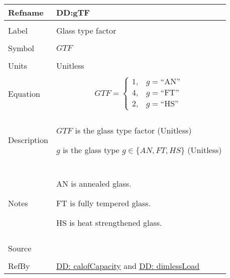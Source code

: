 \documentclass[12pt]{article}
\begin{document}
\vspace{\baselineskip}
\noindent
\begin{minipage}{\textwidth}
\begin{tabular}{>{\raggedright}p{}>{\raggedright\arraybackslash}p{}}
\toprule \textbf{Refname} & \textbf{DD:gTF}
\label{DD:gTF}
\\ \midrule \\
Label & Glass type factor
        
\\ \midrule \\
Symbol & $GTF$
         
\\ \midrule \\
Units & Unitless
        
\\ \midrule \\
Equation & \begin{displaymath}
           GTF=\begin{cases}
               1, & g=\text{``AN''}\\
4, & g=\text{``FT''}\\
2, & g=\text{``HS''}
               \end{cases}
           \end{displaymath}
\\ \midrule \\
Description & \begin{symbDescription}
              \item{$GTF$ is the glass type factor (Unitless)}
              \item{$g$ is the glass type $g\in{}\{AN,FT,HS\}$ (Unitless)}
              \end{symbDescription}
\\ \midrule \\
Notes & AN is annealed glass.
        
        FT is fully tempered glass.
        
        HS is heat strengthened glass.
        
\\ \midrule \\
Source & \cite{astm2009}
         
\\ \midrule \\
RefBy & \hyperref[DD:calofCapacity]{DD: calofCapacity} and \hyperref[DD:dimlessLoad]{DD: dimlessLoad}
        
\\ \bottomrule
\end{tabular}
\end{minipage}
\end{document}
